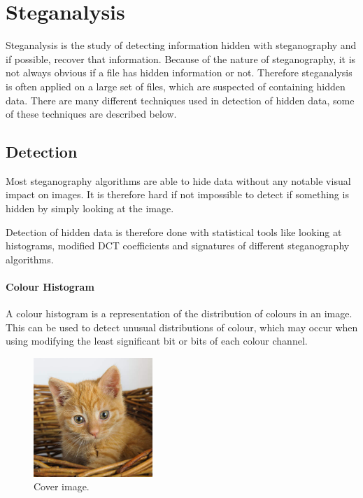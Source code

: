 \section{Steganalysis}
\label{steganalysis}
Steganalysis is the study of detecting information hidden with steganography and if possible, recover that information.
Because of the nature of steganography, it is not always obvious if a file has hidden information or not.
Therefore steganalysis is often applied on a large set of files, which are suspected of containing hidden data.
There are many different techniques used in detection of hidden data, some of these techniques are described below.

\subsection{Detection}
\label{Detection}
Most steganography algorithms are able to hide data without any notable visual impact on images.
It is therefore hard if not impossible to detect if something is hidden by simply looking at the image.

Detection of hidden data is therefore done with statistical tools like looking at histograms, modified DCT coefficients and signatures of different steganography algorithms.

\paragraph*{Colour Histogram}
A colour histogram is a representation of the distribution of colours in an image. 
This can be used to detect unusual distributions of colour, which may occur when using modifying the least significant bit or bits of each colour channel.

\begin{figure}
	\centering
	\includegraphics[width=0.4\textwidth]{figures/cover.jpg}
	\caption{Cover image.}
	\label{fig:CoverImage}
\end{figure}

